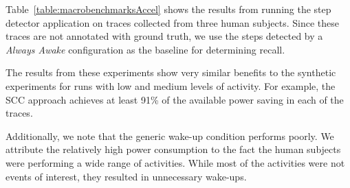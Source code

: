 Table~\ref{table:macrobenchmarksAccel} shows the results from running the
step detector application on traces collected from three human
subjects.  Since these traces are not annotated with ground truth, we
use the steps detected by a {\em Always Awake} configuration as the baseline for
determining recall.

The results from these experiments show very similar
benefits to the synthetic experiments for runs with low and medium
levels of activity.  For example, the SCC approach achieves
at least 91\% of the available power saving in each of the traces.  

Additionally, we note that the generic wake-up condition performs poorly.  We 
attribute the relatively high power consumption to the fact the human subjects 
were performing a wide range of activities.  While most of the activities were 
not events of interest, they resulted in unnecessary wake-ups.


